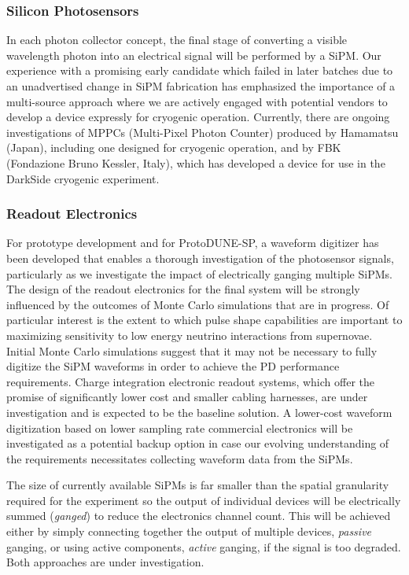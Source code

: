 \subsubsection{Silicon Photosensors} 
In each photon collector concept, the final stage of converting a visible wavelength photon into an electrical signal will be performed by a SiPM. Our experience with a promising early candidate which failed in later batches due to an unadvertised change in SiPM fabrication has emphasized the importance of a multi-source approach where we are actively engaged with potential vendors to develop a device expressly for cryogenic operation. Currently, there are ongoing investigations of MPPCs (Multi-Pixel Photon Counter) produced by Hamamatsu (Japan), including one designed for cryogenic operation, and by FBK (Fondazione Bruno Kessler, Italy), which has developed a device for use in the DarkSide cryogenic experiment.

\subsubsection{Readout Electronics} 
For prototype development and for ProtoDUNE-SP, a waveform digitizer has been developed that enables a thorough investigation of the photosensor signals, particularly as we investigate the impact of electrically ganging multiple SiPMs. The design of the readout electronics for the final system will be strongly influenced by the outcomes of Monte Carlo simulations that are in progress. Of particular interest is the extent to which pulse  shape capabilities are important to maximizing sensitivity to low energy neutrino interactions from supernovae. 
Initial Monte Carlo simulations suggest that it may not be necessary to fully digitize the SiPM waveforms in order to achieve the PD performance requirements.  Charge integration electronic readout systems, which offer the promise of significantly lower cost and smaller cabling harnesses, are under investigation and is expected to be the baseline solution.
A lower-cost waveform digitization based on lower sampling rate commercial electronics will be investigated as a potential backup option in case our evolving understanding of the requirements necessitates collecting waveform data from the SiPMs.

The size of currently available SiPMs is far smaller than the spatial granularity required for the experiment so the output of individual devices will be electrically summed ({\it ganged}) to reduce the electronics channel count. This will be achieved either by simply connecting together the output of multiple devices, {\it passive} ganging, or using active components, {\it active} ganging, if the signal is too degraded. Both approaches are under investigation. 

